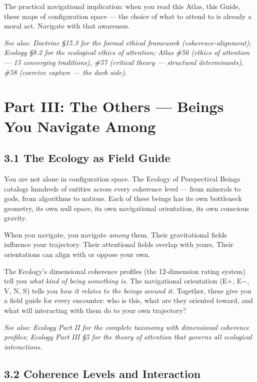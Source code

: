 The practical navigational implication: when you read this Atlas, this Guide, these maps of configuration space — the choice of what to attend to is already a moral act. Navigate with that awareness.


\textit{See also: Doctrine §15.3 for the formal ethical framework (coherence-alignment); Ecology §8.2 for the ecological ethics of attention; Atlas \#56 (ethics of attention — 15 converging traditions), \#57 (critical theory — structural determinants), \#58 (coercive capture — the dark side).}


\bigskip\noindent\makebox[\textwidth]{\color{rulegray}\rule{5cm}{0.3pt}}\bigskip


\section*{Part III: The Others — Beings You Navigate Among}


\subsection*{3.1 The Ecology as Field Guide}


You are not alone in configuration space. The Ecology of Perspectival Beings catalogs hundreds of entities across every coherence level — from minerals to gods, from algorithms to nations. Each of these beings has its own bottleneck geometry, its own null space, its own navigational orientation, its own conscious gravity.


When you navigate, you navigate \textit{among} them. Their gravitational fields influence your trajectory. Their attentional fields overlap with yours. Their orientations can align with or oppose your own.


The Ecology's dimensional coherence profiles (the 12-dimension rating system) tell you \textit{what kind of being something is.} The navigational orientation (E+, E−, V, N, S) tells you \textit{how it relates to the beings around it.} Together, these give you a field guide for every encounter: who is this, what are they oriented toward, and what will interacting with them do to your own trajectory?


\textit{See also: Ecology Part II for the complete taxonomy with dimensional coherence profiles; Ecology Part III §5 for the theory of attention that governs all ecological interactions.}


\subsection*{3.2 Coherence Levels and Interaction}


